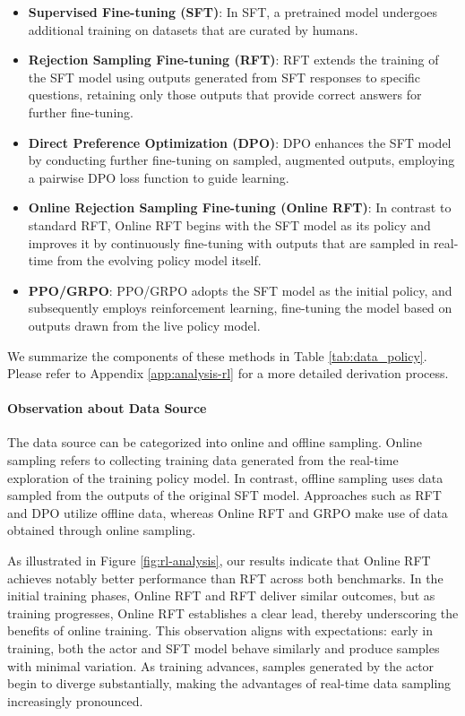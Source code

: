 \begin{itemize}[topsep=0pt]
\begin{itemize}[topsep=0pt]
\begin{itemize}
    \item  \textbf{Supervised Fine-tuning (SFT)}: In SFT, a pretrained model undergoes additional training on datasets that are curated by humans.
    \item \textbf{Rejection Sampling Fine-tuning (RFT)}: RFT extends the training of the SFT model using outputs generated from SFT responses to specific questions, retaining only those outputs that provide correct answers for further fine-tuning.
    \item \textbf{Direct Preference Optimization (DPO)}: DPO enhances the SFT model by conducting further fine-tuning on sampled, augmented outputs, employing a pairwise DPO loss function to guide learning.
    \item \textbf{Online Rejection Sampling Fine-tuning (Online RFT)}: In contrast to standard RFT, Online RFT begins with the SFT model as its policy and improves it by continuously fine-tuning with outputs that are sampled in real-time from the evolving policy model itself.
    \item \textbf{PPO/GRPO}: PPO/GRPO adopts the SFT model as the initial policy, and subsequently employs reinforcement learning, fine-tuning the model based on outputs drawn from the live policy model.
\end{itemize}

We summarize the components of these methods in Table \ref{tab:data_policy}.
Please refer to Appendix \ref{app:analysis-rl} for a more detailed derivation process.

\paragraph{Observation about Data Source} The data source can be categorized into online and offline sampling. Online sampling refers to collecting training data generated from the real-time exploration of the training policy model. In contrast, offline sampling uses data sampled from the outputs of the original SFT model. Approaches such as RFT and DPO utilize offline data, whereas Online RFT and GRPO make use of data obtained through online sampling.

As illustrated in Figure \ref{fig:rl-analysis}, our results indicate that Online RFT achieves notably better performance than RFT across both benchmarks. In the initial training phases, Online RFT and RFT deliver similar outcomes, but as training progresses, Online RFT establishes a clear lead, thereby underscoring the benefits of online training. This observation aligns with expectations: early in training, both the actor and SFT model behave similarly and produce samples with minimal variation. As training advances, samples generated by the actor begin to diverge substantially, making the advantages of real-time data sampling increasingly pronounced.


\end{itemize}
\end{itemize}
